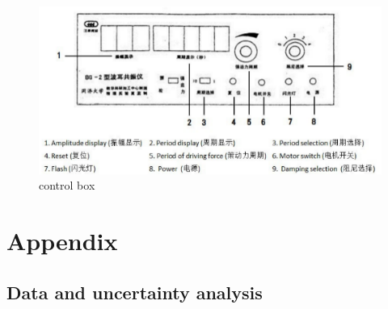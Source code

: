 \documentclass[12pt,a4paper]{article}
\begin{document}
\begin{figure}[h]
    \centering
    \includegraphics[scale=0.5]{control.png}
    \caption{control box}
\end{figure}

\section*{Appendix \uppercase\expandafter{}}
\subsection*{Data and uncertainty analysis}
\end{document}
